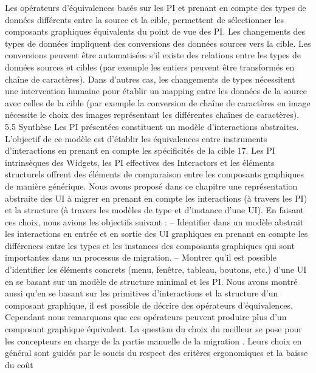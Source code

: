 \documentclass{article}
\begin{document}
Les op\'{e}rateurs d’\'{e}quivalences bas\'{e}s sur les PI et prenant en compte des types de donn\'{e}es
diff\'{e}rents entre la source et la cible, permettent de s\'{e}lectionner les composants graphiques \'{e}quivalents
du point de vue des PI. Les changements des types de donn\'{e}es impliquent des conversions des donn\'{e}es
sources vers la cible. Les conversions peuvent \^{e}tre automatis\'{e}es s’il existe des relations entre les types
de donn\'{e}es sources et cibles (par exemple les entiers peuvent \^{e}tre transform\'{e}s en cha\^{i}ne de caract\`{e}res).
Dans d’autres cas, les changements de types n\'{e}cessitent une intervention humaine pour \'{e}tablir un
mapping entre les donn\'{e}es de la source avec celles de la cible (par exemple la conversion de cha\^{i}ne de
caract\`{e}res en image n\'{e}cessite le choix des images repr\'{e}sentant les diff\'{e}rentes cha\^{i}nes de caract\`{e}res).
5.5
Synth\`{e}se
Les PI pr\'{e}sent\'{e}es constituent un mod\`{e}le d’interactions abstraites. L’objectif de ce mod\`{e}le est
d’\'{e}tablir les \'{e}quivalences entre instruments d’interactions en prenant en compte les sp\'{e}ciﬁcit\'{e}s de la
cible 17. Les PI intrins\`{e}ques des Widgets, les PI effectives des Interactors et les \'{e}l\'{e}ments structurels
offrent des \'{e}l\'{e}ments de comparaison entre les composants graphiques de mani\`{e}re g\'{e}n\'{e}rique.
Nous avons propos\'{e} dans ce chapitre une repr\'{e}sentation abstraite des UI \`{a} migrer en prenant en
compte les interactions (\`{a} travers les PI) et la structure (\`{a} travers les mod\`{e}les de type et d’instance
d’une UI). En faisant ces choix, nous avions les objectifs suivant :
– Identiﬁer dans un mod\`{e}le abstrait les interactions en entr\'{e}e et en sortie des UI graphiques en
prenant en compte les diff\'{e}rences entre les types et les instances des composants graphiques
qui sont importantes dans un processus de migration.
– Montrer qu’il est possible d’identiﬁer les \'{e}l\'{e}ments concrets (menu, fen\^{e}tre, tableau, boutons,
etc.) d’une UI en se basant sur un mod\`{e}le de structure minimal et les PI.
Nous avons montr\'{e} aussi qu’en se basant sur les primitives d’interactions et la structure d’un
composant graphique, il est possible de d\'{e}crire des op\'{e}rateurs d’\'{e}quivalences. Cependant nous remarquons que ces op\'{e}rateurs peuvent produire plus d’un composant graphique \'{e}quivalent. La question du
choix du meilleur se pose pour les concepteurs en charge de la partie manuelle de la migration . Leurs
choix en g\'{e}n\'{e}ral sont guid\'{e}s par le soucis du respect des crit\`{e}res ergonomiques et la baisse du co\^{u}t
\end{document}
